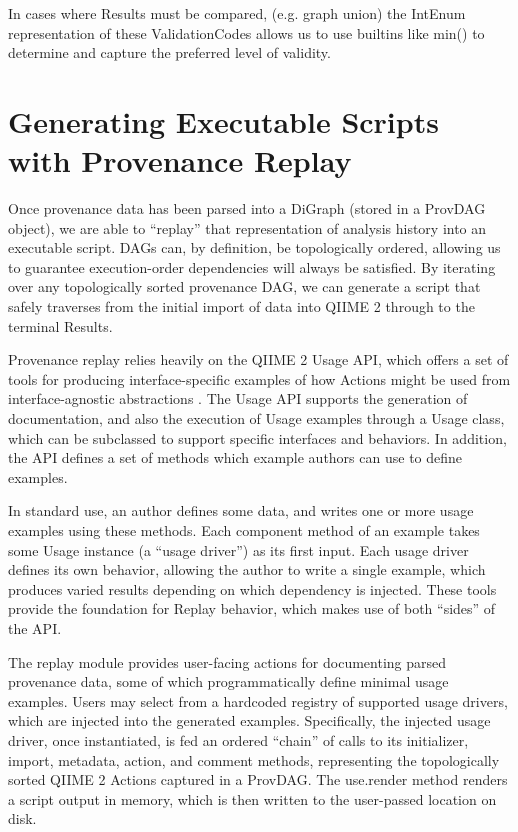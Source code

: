 \noindent In cases where Results must be compared, (e.g. graph union) the IntEnum
representation of these ValidationCodes allows us to use builtins like min() to
determine and capture the preferred level of validity.


\section{Generating Executable Scripts with Provenance Replay}

Once provenance data has been parsed into a DiGraph (stored in a ProvDAG
object), we are able to “replay” that representation of analysis history into an
executable script. DAGs can, by definition, be topologically ordered, allowing
us to guarantee execution-order dependencies will always be satisfied. By
iterating over any topologically sorted provenance DAG, we can generate a script
that safely traverses from the initial import of data into QIIME 2 through to
the terminal Results.

Provenance replay relies heavily on the QIIME 2 Usage API, which offers a set of
tools for producing interface-specific examples of how Actions might be used
from interface-agnostic abstractions \parencite{qiime_2_development_team_usage_2018}.
The Usage API supports the generation of documentation, and also the execution
of Usage examples through a Usage class, which can be subclassed to support
specific interfaces and behaviors. In addition, the API defines a set of methods
which example authors can use to define examples.

In standard use, an author defines some data, and writes one or more usage
examples using these methods. Each component method of an example takes some
Usage instance (a “usage driver”) as its first input. Each usage driver defines
its own behavior, allowing the author to write a single example, which produces
varied results depending on which dependency is injected. These tools provide
the foundation for Replay behavior, which makes use of both “sides” of the API. 

The replay module provides user-facing actions for documenting parsed provenance
data, some of which programmatically define minimal usage examples. Users may
select from a hardcoded registry of supported usage drivers, which are injected
into the generated examples. Specifically, the injected usage driver, once
instantiated, is fed an ordered “chain” of calls to its initializer, import,
metadata, action, and comment methods, representing the topologically sorted
QIIME 2 Actions captured in a ProvDAG. The use.render method renders a script
output in memory, which is then written to the user-passed location on disk.

